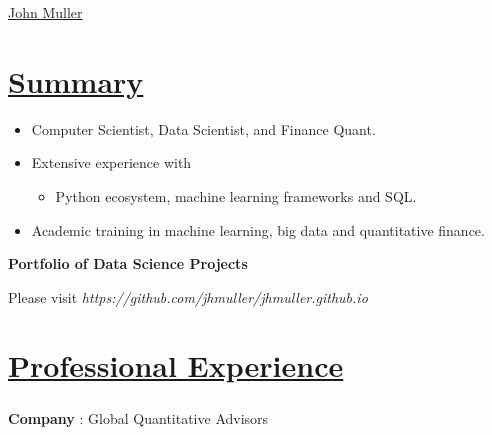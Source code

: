 \documentclass[
]{article}
\author{}
\date{}
\providecommand{\tightlist}{%
  \setlength{\itemsep}{0pt}\setlength{\parskip}{0pt}}
\begin{document}
{\LARGE \underline{John Muller}}
\vspace{0.1in}
\hfill\break


\hypertarget{summary}{%
\section{\texorpdfstring{\underline{\textbf{Summary}}}{Summary}}\label{summary}}

\begin{itemize}
\tightlist
\item
  Computer Scientist, Data Scientist, and Finance Quant.
\item
  Extensive experience with

  \begin{itemize}
  \tightlist
  \item
    Python ecosystem, machine learning frameworks and SQL.
  \end{itemize}
\item
  Academic training in machine learning, big data and
  quantitative finance.
 \end{itemize}
 
 { \large \bf Portfolio of Data Science Projects}

   Please visit \hspace{0.2in} { \emph {https://github.com/jhmuller/jhmuller.github.io}  }




\hypertarget{professional-experience}{\section{\texorpdfstring{\underline{\textbf{Professional
Experience}}}{Professional Experience}}\label{professional-experience}}

\hypertarget{gqa}
{\subsubsection{} \label{gqa}}

\begin{flushleft}
\textbf{Company} : Global Quantitative Advisors
\end{flushleft}
\end{document}
